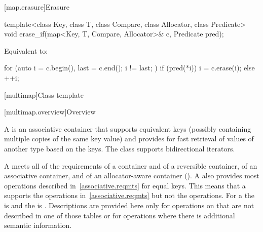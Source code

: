 [map.erasure]{Erasure}

%
\begin{itemdecl}
template<class Key, class T, class Compare, class Allocator, class Predicate>
  void erase_if(map<Key, T, Compare, Allocator>& c, Predicate pred);
\end{itemdecl}

\begin{itemdescr}
\pnum
\effects
Equivalent to:
\begin{codeblock}
for (auto i = c.begin(), last = c.end(); i != last; ) {
  if (pred(*i)) {
    i = c.erase(i);
  } else {
    ++i;
  }
}
\end{codeblock}
\end{itemdescr}

[multimap]{Class template }

[multimap.overview]{Overview}

\pnum
{}%
A
is an associative container that supports equivalent keys (possibly containing multiple copies of
the same key value) and provides for fast retrieval of values of another type
based on the keys.
The
class
supports bidirectional iterators.

\pnum
A
 meets all of the requirements of a container and of a
reversible container, of an associative
container, and of an allocator-aware container
().
A
also provides most operations described in~\ref{associative.reqmts}
for equal keys.
This means that a
supports the
operations in~\ref{associative.reqmts}
but not the
operations.
For a
the
is
and the
is
.
Descriptions are provided here only for operations on
that are not described in one of those tables
or for operations where there is additional semantic information.

